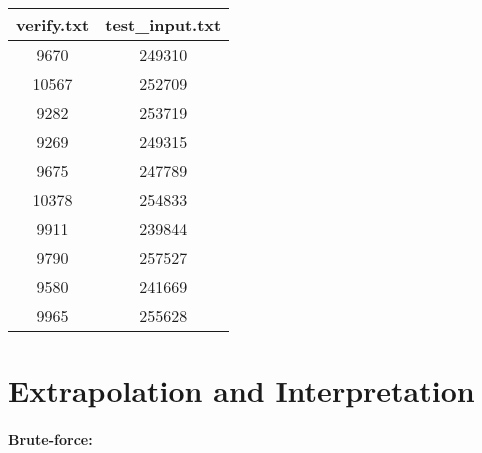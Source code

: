\documentclass[12pt]{article}
\begin{document}
\begin{center}
\begin{tabular}{|c|c|}
\hline
verify.txt & test\_input.txt \\ \hline
9670  & 249310 \\ \hline
10567 & 252709 \\ \hline 
9282  & 253719 \\ \hline 
9269  & 249315 \\ \hline 
9675  & 247789 \\ \hline 
10378 & 254833 \\ \hline 
9911  & 239844 \\ \hline 
9790  & 257527 \\ \hline 
9580  & 241669 \\ \hline 
9965  & 255628 \\
\hline
\end{tabular}
\end{center}

\section*{Extrapolation and Interpretation}

\paragraph*{Brute-force:}
\end{document}
